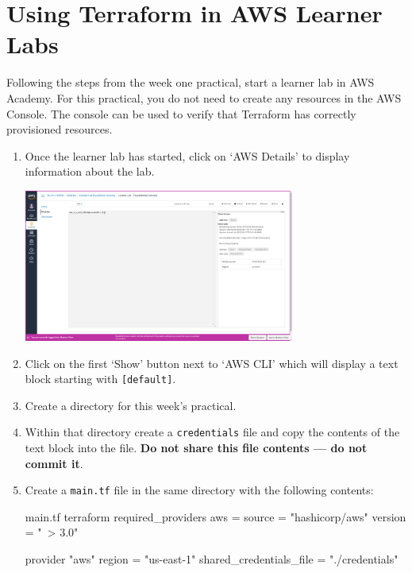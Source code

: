 \documentclass{csse4400}
\begin{document}


\section{Using Terraform in AWS Learner Labs}
Following the steps from the week one practical, start a learner lab in AWS Academy.
For this practical, you do not need to create any resources in the AWS Console.
The console can be used to verify that Terraform has correctly provisioned resources.

\begin{enumerate}
\item Once the learner lab has started, click on `AWS Details' to display information about the lab.

\includegraphics[width=0.7\textwidth]{images/aws-details}

\item Click on the first `Show' button next to `AWS CLI' which will display a text block starting with \texttt{[default]}.
\item Create a directory for this week's practical.
\item Within that directory create a \texttt{credentials} file and copy the contents of the text block into the file.
\textbf{Do not share this file contents --- do not commit it}.
\item Create a \texttt{main.tf} file in the same directory with the following contents:
\begin{code}[language=terraform]{main.tf}
terraform {
    required_providers {
        aws = {
            source  = "hashicorp/aws"
            version = "~> 3.0"
        }
    }
}

provider "aws" {
    region = "us-east-1"
    shared_credentials_file = "./credentials"
}
\end{code}


\end{enumerate}
\end{document}
